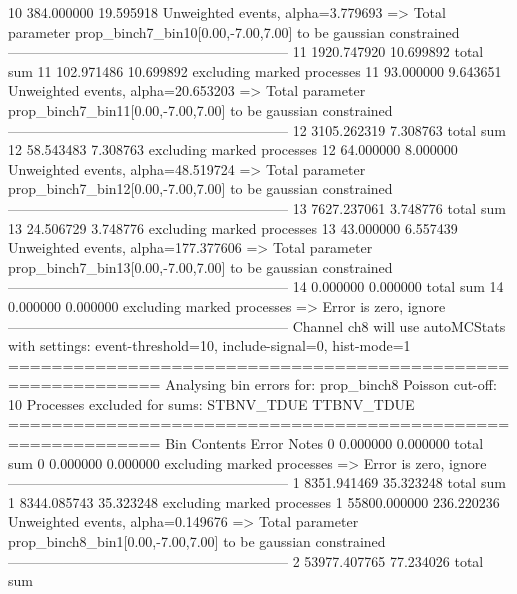 10         384.000000      19.595918       Unweighted events, alpha=3.779693
  => Total parameter prop_binch7_bin10[0.00,-7.00,7.00] to be gaussian constrained
------------------------------------------------------------
11         1920.747920     10.699892       total sum                     
11         102.971486      10.699892       excluding marked processes    
11         93.000000       9.643651        Unweighted events, alpha=20.653203
  => Total parameter prop_binch7_bin11[0.00,-7.00,7.00] to be gaussian constrained
------------------------------------------------------------
12         3105.262319     7.308763        total sum                     
12         58.543483       7.308763        excluding marked processes    
12         64.000000       8.000000        Unweighted events, alpha=48.519724
  => Total parameter prop_binch7_bin12[0.00,-7.00,7.00] to be gaussian constrained
------------------------------------------------------------
13         7627.237061     3.748776        total sum                     
13         24.506729       3.748776        excluding marked processes    
13         43.000000       6.557439        Unweighted events, alpha=177.377606
  => Total parameter prop_binch7_bin13[0.00,-7.00,7.00] to be gaussian constrained
------------------------------------------------------------
14         0.000000        0.000000        total sum                     
14         0.000000        0.000000        excluding marked processes    
  => Error is zero, ignore      
------------------------------------------------------------
Channel ch8 will use autoMCStats with settings: event-threshold=10, include-signal=0, hist-mode=1
============================================================
Analysing bin errors for: prop_binch8
Poisson cut-off: 10
Processes excluded for sums: STBNV_TDUE TTBNV_TDUE
============================================================
Bin        Contents        Error           Notes                         
0          0.000000        0.000000        total sum                     
0          0.000000        0.000000        excluding marked processes    
  => Error is zero, ignore      
------------------------------------------------------------
1          8351.941469     35.323248       total sum                     
1          8344.085743     35.323248       excluding marked processes    
1          55800.000000    236.220236      Unweighted events, alpha=0.149676
  => Total parameter prop_binch8_bin1[0.00,-7.00,7.00] to be gaussian constrained
------------------------------------------------------------
2          53977.407765    77.234026       total sum                     
